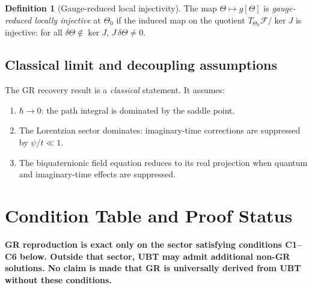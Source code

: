 \documentclass[12pt]{article}
\theoremstyle{definition}
\newtheorem{definition}[theorem]{Definition}
\theoremstyle{remark}
\begin{document}
\begin{definition}[Gauge-reduced local injectivity]
\label{def:gr_injectivity}
The map $\Theta \mapsto g[\Theta]$ is \emph{gauge-reduced locally injective}
at $\Theta_0$ if the induced map on the quotient $T_{\Theta_0}\mathcal{F}/\ker J$
is injective: for all $\delta\Theta \notin \ker J$, $J\,\delta\Theta \neq 0$.
\end{definition}

\subsection{Classical limit and decoupling assumptions}

The GR recovery result is a \emph{classical} statement.  It assumes:
\begin{enumerate}
  \item $\hbar \to 0$: the path integral is dominated by the saddle point.
  \item The Lorentzian sector dominates: imaginary-time corrections are
    suppressed by $\psi/t \ll 1$.
  \item The biquaternionic field equation reduces to its real projection
    when quantum and imaginary-time effects are suppressed.
\end{enumerate}

\section{Condition Table and Proof Status}
\label{sec:conditions}

\begin{tcolorbox}[colback=gray!5!white,colframe=gray!60!black,
                  title=Mandatory Caveat]
\textbf{GR reproduction is exact only on the sector satisfying conditions
C1--C6 below.  Outside that sector, UBT may admit additional non-GR
solutions.  No claim is made that GR is universally derived from UBT without
these conditions.}
\end{tcolorbox}

\bigskip
\end{document}

